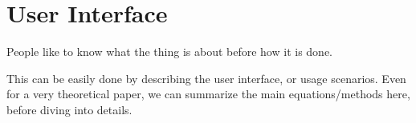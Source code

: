 \section{User Interface}
\label{sec:interface}

People like to know what the thing is about before how it is done.

This can be easily done by describing the user interface, or usage scenarios.
Even for a very theoretical paper, we can summarize the main equations/methods here, before diving into details.

